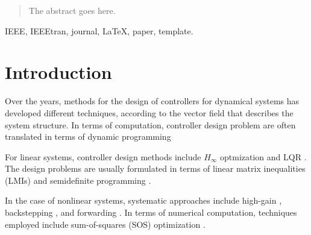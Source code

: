 \documentclass[10pt,twocolumn,twoside]{IEEEtran}
\theoremstyle{plain}
\theoremstyle{definition}
\theoremstyle{remark}
\begin{document}
\maketitle

\begin{abstract}
The abstract goes here.
\end{abstract}

\begin{IEEEkeywords}
IEEE, IEEEtran, journal, \LaTeX, paper, template.
\end{IEEEkeywords}






%
\IEEEpeerreviewmaketitle



\section{Introduction}

Over the years, methods for the design of controllers for dynamical systems has developed different techniques, according to the vector field that describes the system structure. In terms of computation, controller design problem are often translated in terms of dynamic programming 


For linear systems, controller design methods include $H_\infty$ optmization \cite{Doyleetal1992} and LQR \cite{Hespanha:2009}. The design problems are usually formulated in terms of linear matrix inequalities (LMIs) and semidefinite programming \cite{Boyd1994,DullerudPaganini2000}. 

In the case of nonlinear systems, systematic approaches include high-gain  \cite{GrognardSepulchreBastin1999}, backstepping \cite{Krstic1995,SteinShiromoto2013a}, and forwarding \cite{MazencPraly96}. In terms of numerical computation, techniques employed include sum-of-squares (SOS) optimization \cite{Parrilo2003}.
\end{document}
